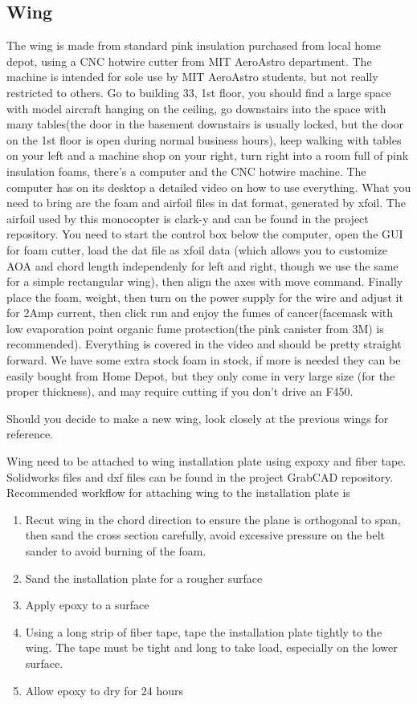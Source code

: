 \documentclass[12pt]{article}
\begin{document}
\subsection{Wing}
The wing is made from standard pink insulation purchased from local home depot, using a CNC hotwire cutter from MIT AeroAstro department. The machine is intended for sole use by MIT AeroAstro students, but not really restricted to others. Go to building 33, 1st floor, you should find a large space with model aircraft hanging on the ceiling, go downstairs into the space with many tables(the door in the basement downstairs is usually locked, but the door on the 1st floor is open during normal business hours), keep walking with tables on your left and a machine shop on your right, turn right into a room full of pink insulation foams, there's a computer and the CNC hotwire machine. The computer has on its desktop a detailed video on how to use everything. What you need to bring are the foam and airfoil files in dat format, generated by xfoil. The airfoil used by this monocopter is clark-y and can be found in the project repository. You need to start the control box below the computer, open the GUI for foam cutter, load the dat file as xfoil data (which allows you to customize AOA and chord length independenly for left and right, though we use the same for a simple rectangular wing), then align the axes with move command. Finally place the foam, weight, then turn on the power supply for the wire and adjust it for 2Amp current, then click run and enjoy the fumes of cancer(facemask with low evaporation point organic fume protection(the pink canister from 3M) is recommended). Everything is covered in the video and should be pretty straight forward. We have some extra stock foam in stock, if more is needed they can be easily bought from Home Depot, but they only come in very large size (for the proper thickness), and may require cutting if you don't drive an F450.

Should you decide to make a new wing, look closely at the previous wings for reference.

Wing need to be attached to wing installation plate using expoxy and fiber tape. Solidworks files and dxf files can be found in the project GrabCAD repository. Recommended workflow for attaching wing to the installation plate is 
\begin{enumerate}
  \item Recut wing in the chord direction to ensure the plane is orthogonal to span, then sand the cross section carefully, avoid excessive pressure on the belt sander to avoid burning of the foam. 
  \item Sand the installation plate for a rougher surface
  \item Apply epoxy to a surface
  \item Using a long strip of fiber tape, tape the installation plate tightly to the wing. The tape must be tight and long to take load, especially on the lower surface.
  \item Allow epoxy to dry for 24 hours
\end{enumerate}
\end{document}
